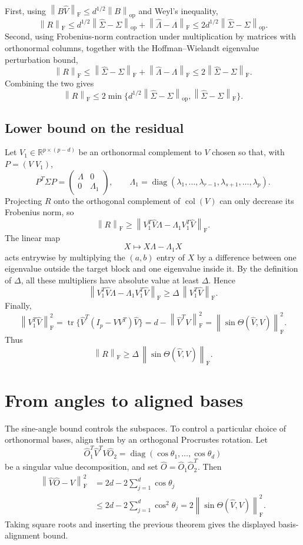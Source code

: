 \documentclass[11pt]{article}
\newcommand{\BaseMat}{\Sigma}
\newcommand{\ErrMat}{\widehat{\Sigma}-\Sigma}
\newcommand{\Sub}{V}
\newcommand{\Subhat}{\widehat V}
\newcommand{\EigDiag}{\Lambda}
\newcommand{\EigDiagHat}{\widehat\Lambda}
\newcommand{\AlignMat}{\widehat O}
\newcommand{\BaseMat}{A}
\newcommand{\ErrMat}{\widetilde A-A}
\newcommand{\Sub}{Q}
\newcommand{\Subhat}{\widetilde Q}
\newcommand{\EigDiag}{D}
\newcommand{\EigDiagHat}{\widetilde D}
\newcommand{\AlignMat}{O}
\newcommand{\R}{\mathbb R}
\newcommand{\gap}{\Delta}
\newcommand{\norm}[1]{\left\lVert #1 \right\rVert}
\newcommand{\op}{\mathrm{op}}
\newcommand{\F}{\mathrm F}
\newcommand{\diag}{\operatorname{diag}}
\newcommand{\tr}{\operatorname{tr}}
\theoremstyle{remark}
\begin{document}
First, using $\norm{B\Subhat}_{\F}\leq d^{1/2}\norm{B}_{\op}$ and Weyl's
inequality,
\[
  \norm{R}_{\F}
  \leq d^{1/2}\norm{\ErrMat}_{\op}+\norm{\EigDiagHat-\EigDiag}_{\F}
  \leq 2d^{1/2}\norm{\ErrMat}_{\op}.
\]
Second, using Frobenius-norm contraction under multiplication by matrices
with orthonormal columns, together with the Hoffman--Wielandt eigenvalue
perturbation bound,
\[
  \norm{R}_{\F}
  \leq \norm{\ErrMat}_{\F}+\norm{\EigDiagHat-\EigDiag}_{\F}
  \leq 2\norm{\ErrMat}_{\F}.
\]
Combining the two gives
\[
  \norm{R}_{\F}
  \leq 2\min\{d^{1/2}\norm{\ErrMat}_{\op},\norm{\ErrMat}_{\F}\}.
\]

\subsection{Lower bound on the residual}

Let $V_1\in\R^{p\times(p-d)}$ be an orthonormal complement to $\Sub$ chosen
so that, with $P=(\Sub\; V_1)$,
\[
  P^T\BaseMat P=\begin{pmatrix}\EigDiag&0\\0&\Lambda_1\end{pmatrix},
  \qquad
  \Lambda_1=\diag(\lambda_1,\ldots,\lambda_{r-1},
                   \lambda_{s+1},\ldots,\lambda_p).
\]
Projecting $R$ onto the orthogonal complement of $\operatorname{col}(\Sub)$
can only decrease its Frobenius norm, so
\[
  \norm{R}_{\F}
  \geq
  \norm{V_1^T\Subhat\EigDiag-\Lambda_1V_1^T\Subhat}_{\F}.
\]
The linear map
\[
  X\mapsto X\EigDiag-\Lambda_1X
\]
acts entrywise by multiplying the $(a,b)$ entry of $X$ by a difference
between one eigenvalue outside the target block and one eigenvalue inside
it.  By the definition of $\gap$, all these multipliers have absolute value
at least $\gap$.  Hence
\[
  \norm{V_1^T\Subhat\EigDiag-\Lambda_1V_1^T\Subhat}_{\F}
  \geq \gap\,\norm{V_1^T\Subhat}_{\F}.
\]
Finally,
\[
  \norm{V_1^T\Subhat}_{\F}^2
  =\tr\{\Subhat^T(I_p-\Sub\Sub^T)\Subhat\}
  =d-\norm{\Subhat^T\Sub}_{\F}^2
  =\norm{\sin\Theta(\Subhat,\Sub)}_{\F}^2.
\]
Thus
\[
  \norm{R}_{\F}
  \geq \gap\,\norm{\sin\Theta(\Subhat,\Sub)}_{\F}.
\]

\section{From angles to aligned bases}

The sine-angle bound controls the subspaces.  To control a particular choice
of orthonormal bases, align them by an orthogonal Procrustes rotation.  Let
\[
  \widehat O_1^T\Subhat^T\Sub\widehat O_2
  =\diag(\cos\theta_1,\ldots,\cos\theta_d)
\]
be a singular value decomposition, and set
$\AlignMat=\widehat O_1\widehat O_2^T$.  Then
\[
\begin{aligned}
  \norm{\Subhat\AlignMat-\Sub}_{\F}^2
  &=2d-2\sum_{j=1}^d\cos\theta_j  \\
  &\leq 2d-2\sum_{j=1}^d\cos^2\theta_j
   =2\norm{\sin\Theta(\Subhat,\Sub)}_{\F}^2.
\end{aligned}
\]
Taking square roots and inserting the previous theorem gives the displayed
basis-alignment bound.
\end{document}
